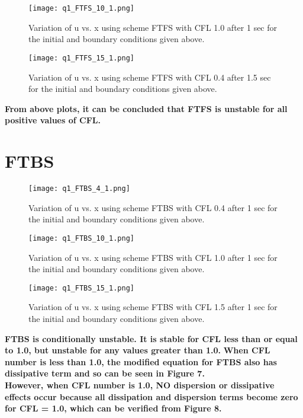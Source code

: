 \documentclass{article}
\begin{document}
\begin{figure}[H] \label{figure}
\texttt{[image: q1\_FTFS\_10\_1.png]}
\caption{Variation of u vs. x using scheme FTFS with CFL 1.0 after 1 sec for the initial and boundary conditions given above.}
\label{figure:}
\end{figure}

\begin{figure}[H] \label{figure}
\texttt{[image: q1\_FTFS\_15\_1.png]}
\caption{Variation of u vs. x using scheme FTFS with CFL 0.4 after 1.5 sec for the initial and boundary conditions given above.}
\label{figure:}
\end{figure}

\textbf{From above plots, it can be concluded that FTFS is unstable for all positive values of CFL.}

\newpage
\section*{FTBS}

\begin{figure}[H] \label{figure}
\texttt{[image: q1\_FTBS\_4\_1.png]}
\caption{Variation of u vs. x using scheme FTBS with CFL 0.4 after 1 sec for the initial and boundary conditions given above.}
\label{figure:}
\end{figure}

\begin{figure}[H] \label{figure}
\texttt{[image: q1\_FTBS\_10\_1.png]}
\caption{Variation of u vs. x using scheme FTBS with CFL 1.0 after 1 sec for the initial and boundary conditions given above.}
\label{figure:}
\end{figure}

\begin{figure}[H] \label{figure}
\texttt{[image: q1\_FTBS\_15\_1.png]}
\caption{Variation of u vs. x using scheme FTBS with CFL 1.5 after 1 sec for the initial and boundary conditions given above.}
\label{figure:}
\end{figure}

\textbf{FTBS is conditionally unstable. It is stable for CFL less than or equal to 1.0, but unstable for any values greater than 1.0.}
\textbf{When CFL number is less than 1.0, the modified equation for FTBS also has dissipative term and so can be seen in Figure 7. 
\\However, when CFL number is 1.0, NO dispersion or dissipative effects occur because all dissipation and dispersion terms become zero for CFL = 1.0, which can be verified from Figure 8.}
\end{document}
